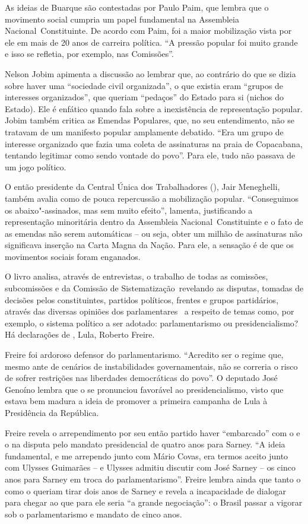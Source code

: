 As ideias de Buarque são contestadas por Paulo Paim, que lembra que o
movimento social cumpria um papel fundamental na Assembleia
Nacional~Constituinte. De acordo com Paim, foi a maior mobilização vista
por ele em mais de 20 anos de carreira política. ``A pressão popular foi
muito grande e isso se refletia, por exemplo, nas Comissões''.

Nelson Jobim apimenta a discussão ao lembrar que, ao contrário do que se
dizia sobre haver uma ``sociedade civil organizada'', o que existia eram
``grupos de interesses organizados'', que queriam ``pedaços'' do Estado
para si (nichos do Estado). Ele é enfático quando fala sobre a
inexistência de representação popular. Jobim também critica as Emendas
Populares, que, no seu entendimento, não se tratavam de um manifesto
popular amplamente debatido. ``Era um grupo de interesse organizado que
fazia uma coleta de assinaturas na praia de Copacabana, tentando
legitimar como sendo vontade do povo''. Para ele, tudo não passava de um
jogo político.

O então presidente da Central Única dos Trabalhadores (), Jair
Meneghelli, também avalia como de pouca repercussão a mobilização
popular. ``Conseguimos os abaixo"-assinados, mas sem muito efeito'',
lamenta, justificando a representação minoritária dentro da Assembleia
Nacional~Constituinte e o fato de as emendas não serem automáticas -- ou
seja, obter um milhão de assinaturas não significava inserção na Carta
Magna da Nação. Para ele, a sensação é de que os movimentos sociais
foram enganados.

O livro analisa, através de entrevistas, o trabalho de todas as
comissões, subcomissões e da Comissão de Sistematização~revelando as
disputas, tomadas de decisões pelos constituintes, partidos políticos,
frentes e grupos partidários, através das diversas opiniões dos
parlamentares~ a respeito de temas como, por exemplo, o sistema político
a ser adotado: parlamentarismo ou presidencialismo? Há declarações de
, Lula, Roberto Freire.

Freire foi ardoroso defensor do parlamentarismo. ``Acredito ser o regime
que, mesmo ante de cenários de instabilidades governamentais, não se
correria o risco de sofrer restrições nas liberdades democráticas do
povo''. O deputado José Genoíno lembra que o  se pronunciou favorável
ao presidencialismo, visto que estava bem madura a ideia de promover a
primeira campanha de Lula à Presidência da República.

Freire revela o arrependimento por seu então partido  haver
``embarcado'' com o  e o  na disputa pelo mandato presidencial de
quatro anos para Sarney. ``A ideia fundamental, e me arrependo junto com
Mário Covas, era termos aceito junto com Ulysses Guimarães -- e Ulysses
admitiu discutir com José Sarney -- os cinco anos para Sarney em troca
do parlamentarismo''. Freire lembra ainda que tanto o  como o 
queriam tirar dois anos de Sarney e revela a incapacidade de dialogar
para chegar ao que para ele seria ``a grande negociação'': o Brasil
passar a vigorar sob o parlamentarismo e mandato de cinco anos.

